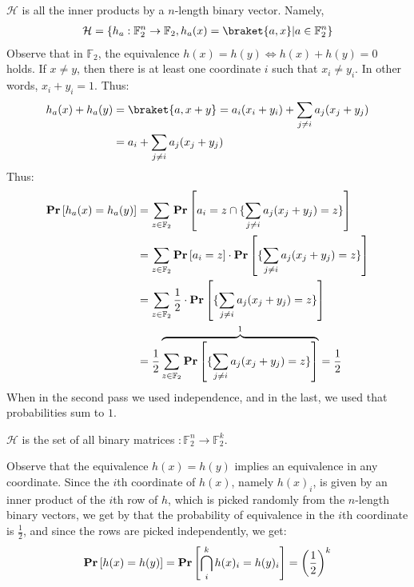 \begin{example}
  \label{example:vec}
  $\mathcal{H}$ is all the inner products by a $n$-length binary vector. Namely, 
  \begin{equation*}
    \begin{split}
  \mathcal{H} = \{ h_{a} :  \mathbb{F}_{2}^{n} \rightarrow \mathbb{F}_2, h_{a}(x) = \braket{a,x} | a \in  \mathbb{F}_{2}^{n}\}
    \end{split}
  \end{equation*}
Observe that in $\mathbb{F}_{2}$, the equivalence $h(x) = h(y) \Leftrightarrow h(x) + h(y) = 0$ holds. If $x \neq y$, then there is at least one coordinate $i$ such that $x_{i} \neq y_{i}$. In other words, $x_{i} + y_{i} = 1$. Thus:
  \begin{equation*}
    \begin{split}
      h_{a}(x) + h_{a}(y) &=  \braket{a, x +y } = a_{i}(x_{i} + y_{i})  +  \sum_{j \neq i } a_{j}( x_{j} + y_{j}) \\ 
      & = a_{i} +  \sum_{j \neq i } a_{j}( x_{j} + y_{j}) 
    \end{split}
  \end{equation*}
  Thus: 
  \begin{equation*}
    \begin{split}
      \mathbf{Pr} \left[  h_{a}(x) = h_{a}(y)   \right] &=  \sum_{z \in \mathbb{F}_{2} } \mathbf{Pr} \left[    a_{i} = z \cap  \{ \sum_{j \neq i } a_{j}( x_{j} + y_{j}) = z \}   \right] \\
    &=  \sum_{z \in \mathbb{F}_{2} } \mathbf{Pr} \left[    a_{i} = z  \right] \cdot \mathbf{Pr} \left[  \{ \sum_{j \neq i } a_{j}( x_{j} + y_{j}) = z \}   \right] \\
    &=   \sum_{z \in \mathbb{F}_{2}} \frac{1}{2} \cdot \mathbf{Pr} \left[  \{ \sum_{j \neq i } a_{j}( x_{j} + y_{j}) = z \}   \right] \\
    &=   \frac{1}{2}\overbrace{\sum_{z \in \mathbb{F}_{2}} \mathbf{Pr} \left[  \{ \sum_{j \neq i } a_{j}( x_{j} + y_{j}) = z \}   \right] }^{ 1}  = \frac{1}{2}
    \end{split}
  \end{equation*}
When in the second pass we used independence, and in the last, we used that probabilities sum to $1$.
\end{example}
\begin{example}
  $\mathcal{H}$ is the set of all binary matrices $ : \mathbb{F}_{2}^{n} \rightarrow \mathbb{F}_{2}^{k}$.

Observe that the equivalence $h(x) = h(y)$ implies an equivalence in any coordinate. Since the $i$th coordinate of $h(x)$, namely $h(x)_{i}$, is given by an inner product of the $i$th row of $h$, which is picked randomly from the $n$-length binary vectors, we get by  that the probability of equivalence in the $i$th coordinate is $\frac{1}{2}$, and since the rows are picked independently, we get:
  \begin{equation*}
    \begin{split}
      \mathbf{Pr} \left[  h(x) = h(y) \right] = \mathbf{Pr} \left[  \bigcap_{i}^{k} h(x)_{i} = h(y)_{i} \right]  = \left( \frac{1}{2} \right)^{k}
    \end{split}
  \end{equation*}
\end{example}
